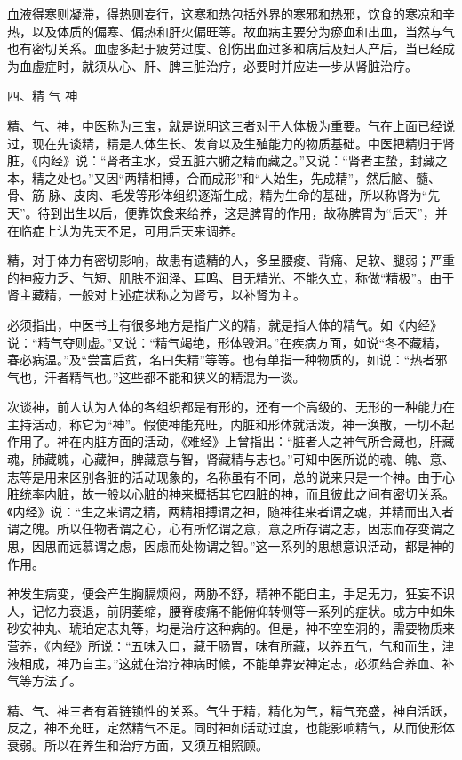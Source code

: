 \documentclass[a4paper,12pt,UTF8,twoside]{ctexbook}
\begin{document}
血液得寒则凝滞，得热则妄行，这寒和热包括外界的寒邪和热邪，饮食的寒凉和辛热，以及体质的偏寒、偏热和肝火偏旺等。故血病主要分为瘀血和出血，当然与气也有密切关系。血虚多起于疲劳过度、创伤出血过多和病后及妇人产后，当已经成为血虚症时，就须从心、肝、脾三脏治疗，必要时并应进一步从肾脏治疗。

四、精 气 神

精、气、神，中医称为三宝，就是说明这三者对于人体极为重要。气在上面已经说过，现在先谈精，精是人体生长、发育以及生殖能力的物质基础。中医把精归于肾脏，《内经》说：“肾者主水，受五脏六腑之精而藏之。”又说：“肾者主蛰，封藏之本，精之处也。”又因“两精相搏，合而成形”和“人始生，先成精”，然后脑、髓、骨、筋 脉、皮肉、毛发等形体组织逐渐生成，精为生命的基础，所以称肾为“先天”。待到出生以后，便靠饮食来给养，这是脾胃的作用，故称脾胃为“后天”，并在临症上认为先天不足，可用后天来调养。

精，对于体力有密切影响，故患有遗精的人，多呈腰痠、背痛、足软、腿弱；严重的神疲力乏、气短、肌肤不润泽、耳鸣、目无精光、不能久立，称做“精极”。由于肾主藏精，一般对上述症状称之为肾亏，以补肾为主。

必须指出，中医书上有很多地方是指广义的精，就是指人体的精气。如《内经》说：“精气夺则虚。”又说：“精气竭绝，形体毁沮。”在疾病方面，如说“冬不藏精，春必病温。”及“尝富后贫，名曰失精”等等。也有单指一种物质的，如说：“热者邪气也，汗者精气也。”这些都不能和狭义的精混为一谈。

次谈神，前人认为人体的各组织都是有形的，还有一个高级的、无形的一种能力在主持活动，称它为“神”。假使神能充旺，内脏和形体就活泼，神一涣散，一切不起作用了。神在内脏方面的活动，《难经》上曾指出：“脏者人之神气所舍藏也，肝藏魂，肺藏魄，心藏神，脾藏意与智，肾藏精与志也。”可知中医所说的魂、魄、意、志等是用来区别各脏的活动现象的，名称虽有不同，总的说来只是一个神。由于心脏统率内脏，故一般以心脏的神来概括其它四脏的神，而且彼此之间有密切关系。《内经》说：“生之来谓之精，两精相搏谓之神，随神往来者谓之魂，并精而出入者谓之魄。所以任物者谓之心，心有所忆谓之意，意之所存谓之志，因志而存变谓之思，因思而远慕谓之虑，因虑而处物谓之智。”这一系列的思想意识活动，都是神的作用。

神发生病变，便会产生胸膈烦闷，两胁不舒，精神不能自主，手足无力，狂妄不识人，记忆力衰退，前阴萎缩，腰脊痠痛不能俯仰转侧等一系列的症状。成方中如朱砂安神丸、琥珀定志丸等，均是治疗这种病的。但是，神不空空洞的，需要物质来营养，《内经》所说：“五味入口，藏于肠胃，味有所藏，以养五气，气和而生，津液相成，神乃自主。”这就在治疗神病时候，不能单靠安神定志，必须结合养血、补气等方法了。

精、气、神三者有着链锁性的关系。气生于精，精化为气，精气充盛，神自活跃，反之，神不充旺，定然精气不足。同时神如活动过度，也能影响精气，从而使形体衰弱。所以在养生和治疗方面，又须互相照顾。
\end{document}
